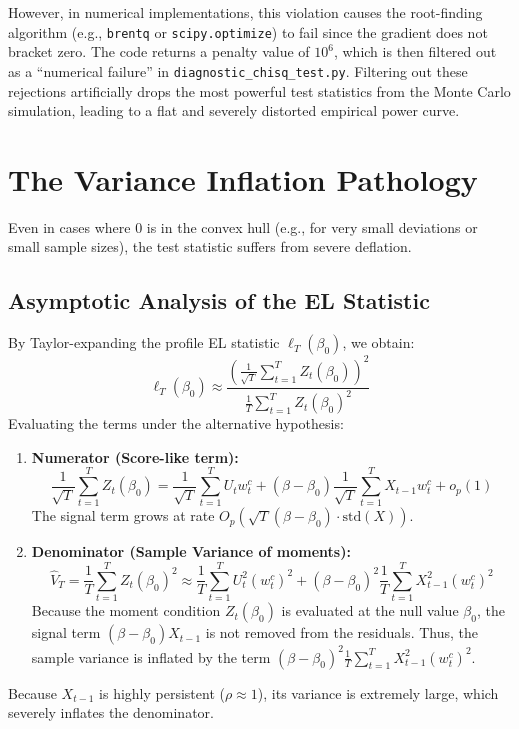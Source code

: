 \documentclass[12pt]{article}
\begin{document}
However, in numerical implementations, this violation causes the root-finding algorithm (e.g., \texttt{brentq} or \texttt{scipy.optimize}) to fail since the gradient does not bracket zero. The code returns a penalty value of $10^6$, which is then filtered out as a ``numerical failure'' in \texttt{diagnostic\_chisq\_test.py}. Filtering out these rejections artificially drops the most powerful test statistics from the Monte Carlo simulation, leading to a flat and severely distorted empirical power curve.

\section{The Variance Inflation Pathology}

Even in cases where $0$ is in the convex hull (e.g., for very small deviations or small sample sizes), the test statistic suffers from severe deflation.

\subsection{Asymptotic Analysis of the EL Statistic}
By Taylor-expanding the profile EL statistic $\ell_T(\beta_0)$, we obtain:
\begin{equation}
    \ell_T(\beta_0) \approx \frac{\left( \frac{1}{\sqrt{T}} \sum_{t=1}^T Z_t(\beta_0) \right)^2}{\frac{1}{T} \sum_{t=1}^T Z_t(\beta_0)^2}
\end{equation}
Evaluating the terms under the alternative hypothesis:
\begin{enumerate}
    \item \textbf{Numerator (Score-like term):}
    \begin{equation}
        \frac{1}{\sqrt{T}} \sum_{t=1}^T Z_t(\beta_0) = \frac{1}{\sqrt{T}} \sum_{t=1}^T U_t w^c_t + (\beta - \beta_0) \frac{1}{\sqrt{T}} \sum_{t=1}^T X_{t-1} w^c_t + o_p(1)
    \end{equation}
    The signal term grows at rate $O_p(\sqrt{T}(\beta - \beta_0) \cdot \text{std}(X))$.

    \item \textbf{Denominator (Sample Variance of moments):}
    \begin{equation}
        \widehat{V}_T = \frac{1}{T} \sum_{t=1}^T Z_t(\beta_0)^2 \approx \frac{1}{T} \sum_{t=1}^T U_t^2 (w^c_t)^2 + (\beta - \beta_0)^2 \frac{1}{T} \sum_{t=1}^T X_{t-1}^2 (w^c_t)^2
    \end{equation}
    Because the moment condition $Z_t(\beta_0)$ is evaluated at the null value $\beta_0$, the signal term $(\beta - \beta_0) X_{t-1}$ is not removed from the residuals. Thus, the sample variance is inflated by the term $(\beta - \beta_0)^2 \frac{1}{T} \sum_{t=1}^T X_{t-1}^2 (w^c_t)^2$.
\end{enumerate}
Because $X_{t-1}$ is highly persistent ($\rho \approx 1$), its variance is extremely large, which severely inflates the denominator.
\end{document}
